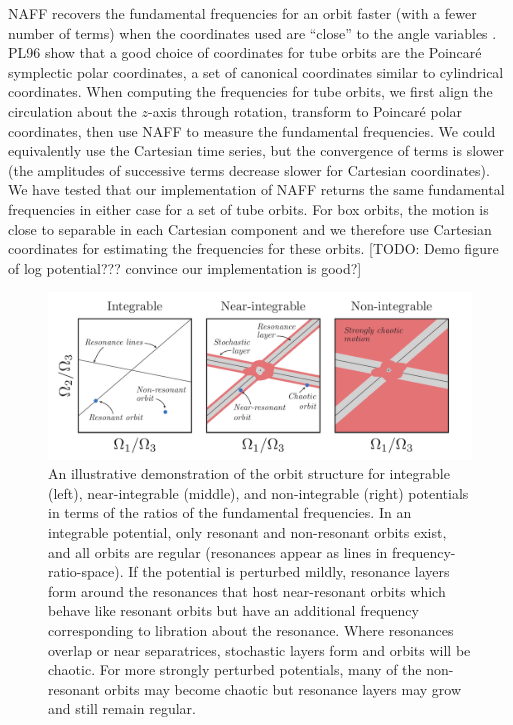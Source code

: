 \documentclass[letterpaper,12pt,preprint]{aastex}
\begin{document}
NAFF recovers the fundamental frequencies for an orbit faster (with a fewer number of terms) when the coordinates used are ``close'' to the angle variables \cite[PL96;][]{papaphilippou96}. PL96 show that a good choice of coordinates for tube orbits are the Poincar\'e symplectic polar coordinates, a set of canonical coordinates similar to cylindrical coordinates. When computing the frequencies for tube orbits, we first align the circulation about the $z$-axis through rotation, transform to Poincar\'e polar coordinates, then use NAFF to measure the fundamental frequencies. We could equivalently use the Cartesian time series, but the convergence of terms is slower (the amplitudes of successive terms decrease slower for Cartesian coordinates). We have tested that our implementation of NAFF returns the same fundamental frequencies in either case for a set of tube orbits. For box orbits, the motion is close to separable in each Cartesian component and we therefore use Cartesian coordinates for estimating the frequencies for these orbits. [TODO: Demo figure of log potential??? convince our implementation is good?]

\begin{figure}[!p]
\begin{center}
\includegraphics[width=\textwidth]{figures/cartoons.pdf}
\caption{An illustrative demonstration of the orbit structure for integrable (left), near-integrable (middle), and non-integrable (right) potentials in terms of the ratios of the fundamental frequencies. In an integrable potential, only resonant and non-resonant orbits exist, and all orbits are regular (resonances appear as lines in frequency-ratio-space). If the potential is perturbed mildly, resonance layers form around the resonances that host near-resonant orbits which behave like resonant orbits but have an additional frequency corresponding to libration about the resonance. Where resonances overlap or near separatrices, stochastic layers form and orbits will be chaotic. For more strongly perturbed potentials, many of the non-resonant orbits may become chaotic but resonance layers may grow and still remain regular. } 
\label{fig:cartoons}
\end{center}
\end{figure}
\end{document}
